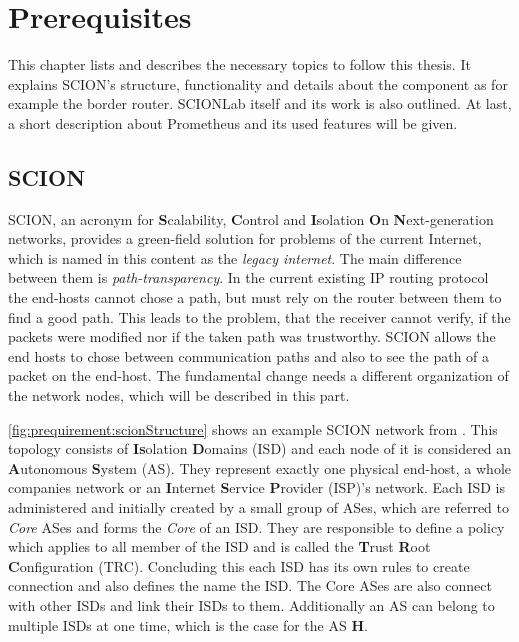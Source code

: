 \documentclass[thesis.tex]{subfiles}
\begin{document}
\chapter{Prerequisites}\label{chap:preq}

This chapter lists and describes the necessary topics to follow this thesis. It explains SCION's structure, functionality and details about the component as for example the border router. SCIONLab itself and its work is also outlined. At last, a short description about Prometheus and its used features will be given.

\section{SCION} \cite{SCIONPaper, SCIONBook}

SCION, an acronym for \textbf{S}calability, \textbf{C}ontrol and \textbf{I}solation \textbf{O}n \textbf{N}ext-generation networks, provides a green-field solution for problems of the current Internet, which is named in this content as the \textit{legacy internet}. The main difference between them is \textit{path-transparency}. In the current existing IP routing protocol the end-hosts cannot chose a path, but must rely on the router between them to find a good path. This leads to the problem, that the receiver cannot verify, if the packets were modified nor if the taken path was trustworthy. SCION allows the end hosts to chose between communication paths and also to see the path of a packet on the end-host. The fundamental change needs a different organization of the network nodes, which will be described in this part.

\autoref{fig:prequirement:scionStructure} shows an example SCION network from \cite{SCIONPaper}. This topology consists of \textbf{Is}olation \textbf{D}omains (ISD) and each node of it is considered an \textbf{A}utonomous \textbf{S}ystem (AS). They represent exactly one physical end-host, a whole companies network or an \textbf{I}nternet \textbf{S}ervice \textbf{P}rovider (ISP)'s network. Each ISD is administered and initially created by a small group of ASes, which are referred to \textit{Core} ASes and forms the \textit{Core} of an ISD. They are responsible to define a policy which applies to all member of the ISD and is called the \textbf{T}rust \textbf{R}oot \textbf{C}onfiguration (TRC). Concluding this each ISD has its own rules to create connection and also defines the name the ISD. The Core ASes are also connect with other ISDs and link their ISDs to them. Additionally an AS can belong to multiple ISDs at one time, which is the case for the AS \textbf{H}.
\end{document}
